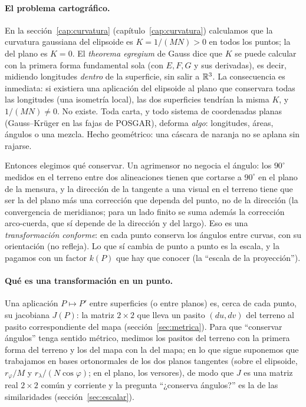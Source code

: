 \paragraph{El problema cartográfico.} En la sección~\ref{cap:curvatura} (capítulo~\ref{cap:curvatura}) calculamos que la
curvatura gaussiana del elipsoide es \(K=1/(MN)>0\) en todos los puntos; la del plano es
\(K=0\). El \emph{theorema egregium} de Gauss dice que \(K\) se puede calcular con la
primera forma fundamental sola (con \(E,F,G\) y sus derivadas), es decir, midiendo
longitudes \emph{dentro} de la superficie, sin salir a \(\mathbb{R}^3\). La consecuencia es
inmediata: si existiera una aplicación del elipsoide al plano que conservara todas las
longitudes (una isometría local), las dos superficies tendrían la misma \(K\), y
\(1/(MN)\neq0\). No existe. Toda carta, y todo sistema de coordenadas planas
(Gauss--Krüger en las fajas de POSGAR), deforma \emph{algo}: longitudes, áreas, ángulos o
una mezcla. Hecho geométrico: una cáscara de naranja no se aplana sin rajarse.

Entonces elegimos qué conservar. Un agrimensor no negocia el ángulo: los \(90^\circ\)
medidos en el terreno entre dos alineaciones tienen que cortarse a \(90^\circ\) en
el plano de la mensura, y la dirección de la tangente a una visual en el terreno tiene
que ser la del plano más una corrección que dependa del punto, no de la dirección (la
convergencia de meridianos; para un lado finito se suma además la corrección
arco-cuerda, que sí depende de la dirección y del largo). Eso es una
\emph{transformación conforme}: en cada punto conserva los ángulos entre curvas, con su
orientación (no refleja). Lo que sí cambia de punto a punto es la escala, y la pagamos con
un factor \(k(P)\) que hay que conocer (la \enquote{escala de la proyección}).

\paragraph{Qué es una transformación en un punto.} Una aplicación \(P\mapsto P'\) entre
superficies (o entre planos) es, cerca de cada punto, su jacobiana \(J(P)\): la matriz
\(2\times2\) que lleva un pasito \((du,dv)\) del terreno al pasito correspondiente del mapa
(sección~\ref{sec:metrica}). Para que \enquote{conservar ángulos} tenga sentido métrico, medimos
los pasitos del terreno con la primera forma del terreno y los del mapa con la del mapa; en
lo que sigue suponemos que trabajamos en bases ortonormales de los dos planos tangentes
(sobre el elipsoide, \(r_\varphi/M\) y \(r_\lambda/(N\cos\varphi)\); en el plano, los
versores), de modo que \(J\) es una matriz real \(2\times2\) común y corriente y la
pregunta \enquote{¿conserva ángulos?} es la de las similaridades (sección~\ref{sec:escalar}).

